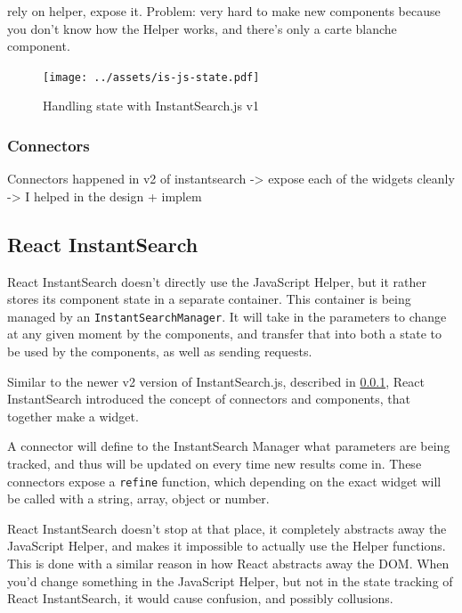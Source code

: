 rely on helper, expose it. Problem: very hard to make new components because you don't know how the Helper works, and there's only a carte blanche component. %

\begin{figure}[H]
\label{figure:is-js-state}
  \centering
  \texttt{[image: ../assets/is-js-state.pdf]}
  \caption{Handling state with InstantSearch.js v1}
\end{figure}

\subsubsection{Connectors} %
\label{ssub:instantsearch_js_connectors}

Connectors happened in v2 of instantsearch
-> expose each of the widgets cleanly
-> I helped in the design + implem %



\subsection{React InstantSearch} %
\label{sub:react_instantearch}

React InstantSearch doesn't directly use the JavaScript Helper, but it rather stores its component state in a separate container. This container is being managed by an {\tt InstantSearchManager}. It will take in the parameters to change at any given moment by the components, and transfer that into both a state to be used by the components, as well as sending requests.

Similar to the newer v2 version of InstantSearch.js, described in \ref{ssub:instantsearch_js_connectors}, React InstantSearch introduced the concept of connectors and components, that together make a widget.

A connector will define to the InstantSearch Manager what parameters are being tracked, and thus will be updated on every time new results come in. These connectors expose a {\tt refine} function, which depending on the exact widget will be called with a string, array, object or number.

React InstantSearch doesn't stop at that place, it completely abstracts away the JavaScript Helper, and makes it impossible to actually use the Helper functions. This is done with a similar reason in how React abstracts away the DOM. When you'd change something in the JavaScript Helper, but not in the state tracking of React InstantSearch, it would cause confusion, and possibly collusions.

